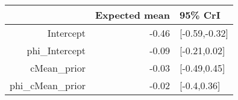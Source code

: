 \begin{tabular}{rrl}
  \hline
 & Expected mean & 95\% CrI \\ 
  \hline
Intercept & -0.46 & [-0.59,-0.32] \\ 
  phi\_Intercept & -0.09 & [-0.21,0.02] \\ 
  cMean\_prior & -0.03 & [-0.49,0.45] \\ 
  phi\_cMean\_prior & -0.02 & [-0.4,0.36] \\ 
   \hline
\end{tabular}

